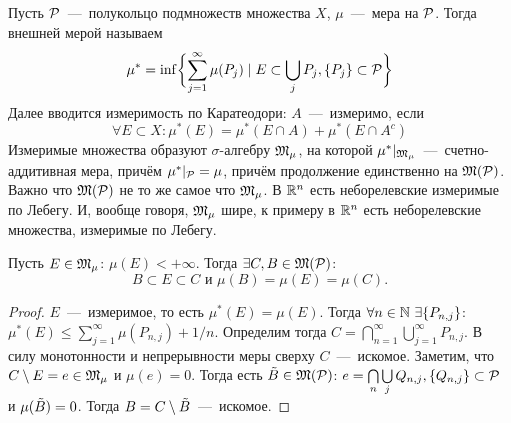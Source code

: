 \begin{reminder}
    Пусть $\mathcal{P}$~---~полукольцо подмножеств множества $X$, $\mu$~---~мера на $\mathcal{P}$. Тогда внешней мерой называем \[\mu^* = \inf \biggl\{\sum\limits_{j = 1}^\infty \mu(P_j) \mid E \subset \bigcup\limits_j P_j, \{P_j\} \subset \mathcal{P}\biggr\}\]
    Далее вводится измеримость по Каратеодори: $A$~---~измеримо, если \[\forall E \subset X: \mu^*(E) = \mu^*(E \cap A) + \mu^*(E \cap A^c)\]
    Измеримые множества образуют $\sigma$-алгебру $\mathfrak{M}_{\mu}$, на которой $\mu^* |_{\mathfrak{M}_{\mu}}$~---~счетно-аддитивная мера, причём $\mu^*|_{\mathcal{P}} = \mu$, причём продолжение единственно на $\mathfrak{M}(\mathcal{P})$. Важно что $\mathfrak{M}(\mathcal{P})$ не то же самое что  $\mathfrak{M}_{\mu}$. В $\mathbb{R}^n$ есть неборелевские измеримые по Лебегу. И, вообще говоря, $\mathfrak{M}_{\mu}$ шире, к примеру в $\mathbb{R}^n$ есть неборелевские множества, измеримые по Лебегу.
\end{reminder}
\begin{lemma}
    Пусть $E \in \mathfrak{M}_\mu$: $\mu (E) < +\infty$. Тогда $\exists C, B \in \mathfrak{M}(\mathcal{P})$: $$B \subset E \subset C \text{  и  } \mu(B) = \mu(E) = \mu(C).$$
\end{lemma}
\begin{proof}
    $E$~---~измеримое, то есть $\mu^*(E) = \mu(E)$.
    Тогда $\forall n \in \mathbb{N} \ \exists \{P_{n, j}\}$: $\mu^*(E) \leq \sum\limits_{j = 1}^\infty \mu(P_{n, j}) + 1/n$. Определим тогда $C = \bigcap\limits_{n = 1}^\infty\bigcup\limits_{j = 1}^\infty P_{n, j}$. В силу монотонности и непрерывности меры сверху $C$~---~искомое. Заметим, что $C \setminus E = e \in \mathfrak{M}_\mu$ и $\mu(e) = 0$. Тогда есть $\Tilde{B} \in \mathfrak{M}(\mathcal{P})$: $e = \bigcap\limits_n\bigcup\limits_j Q_{n, j}, \{Q_{n, j}\} \subset \mathcal{P}$ и $\mu(\Tilde{B}) = 0$. Тогда $B = C \setminus \Tilde{B}$~---~искомое.
\end{proof}
